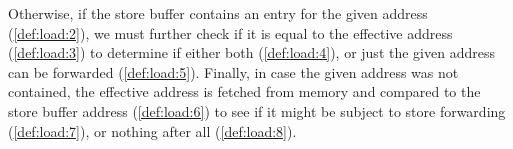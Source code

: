 Otherwise, if the store buffer contains an entry for the given address (\ref{def:load:2}), we must further check if it is equal to the effective address (\ref{def:load:3}) to determine if either both (\ref{def:load:4}), or just the given address can be forwarded (\ref{def:load:5}).
Finally, in case the given address was not contained,
the effective address is fetched from memory and compared to the store buffer address (\ref{def:load:6}) to see if it
might be subject to store forwarding (\ref{def:load:7}), or nothing after all (\ref{def:load:8}).



